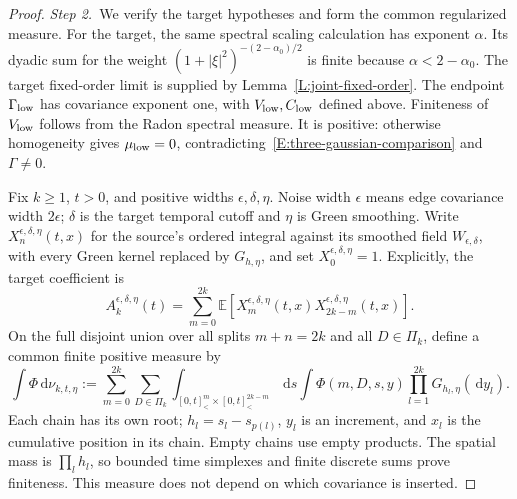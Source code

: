 \documentclass[12pt,oneside,openany]{book}
\numberwithin{equation}{section}
\theoremstyle{nogostyle}
\theoremstyle{definition}
\newcommand{\E}{\mathbb{E}}
\newcommand{\ud}{\,\mathrm{d}}
\begin{document}
\begin{proof}
  \medskip
  \noindent\textit{Step 2.~}We verify the target hypotheses and form the
  common regularized measure.
  For the target, the same spectral scaling calculation has exponent $\alpha$.
  Its dyadic sum for the weight $(1+|\xi|^2)^{-(2-\alpha_0)/2}$ is finite
  because $\alpha < 2-\alpha_0$. The target fixed-order limit is supplied by
  Lemma~\ref{L:joint-fixed-order}. The endpoint $\Gamma_{\rm low}$ has
  covariance exponent one, with $V_{\rm low},C_{\rm low}$ defined above.
  Finiteness of $V_{\rm low}$ follows from the Radon spectral measure. It is
  positive: otherwise homogeneity gives $\mu_{\rm low} = 0$,
  contradicting~\eqref{E:three-gaussian-comparison} and $\Gamma \ne 0$.

  Fix $k \ge 1$, $t > 0$, and positive widths $\epsilon,\delta,\eta$. Noise
  width $\epsilon$ means edge covariance width $2\epsilon$; $\delta$ is the
  target temporal cutoff and $\eta$ is Green smoothing. Write
  $X_n^{\epsilon,\delta,\eta}(t,x)$ for the source's ordered integral against
  its smoothed field $W_{\epsilon,\delta}$, with every Green kernel replaced by
  $G_{h,\eta}$, and set $X_0^{\epsilon,\delta,\eta} = 1$. Explicitly, the target
  coefficient is
  \[
    A_k^{\epsilon,\delta,\eta}(t)
    =\sum_{m=0}^{2k}
    \E\left[X_m^{\epsilon,\delta,\eta}(t,x)
    X_{2k-m}^{\epsilon,\delta,\eta}(t,x)\right].
  \]
  On the full disjoint union over all splits $m+n = 2k$ and all $D \in \Pi_k$,
  define a common finite positive measure by
  \[
    \int\Phi\ud\nu_{k,t,\eta}
    :=\sum_{m=0}^{2k}\sum_{D\in\Pi_k}
    \int_{[0,t]^m_<\times[0,t]^{2k-m}_<}\ud s
    \int\Phi(m,D,s,y)\prod_{l=1}^{2k}G_{h_l,\eta}(\ud y_l).
  \]
  Each chain has its own root; $h_l = s_l-s_{p(l)}$, $y_l$ is an increment, and
  $x_l$ is the cumulative position in its chain. Empty chains use empty
  products. The spatial mass is $\prod_lh_l$, so bounded time simplexes and
  finite discrete sums prove finiteness. This measure does not depend on which
  covariance is inserted.


\end{proof}
\end{document}
